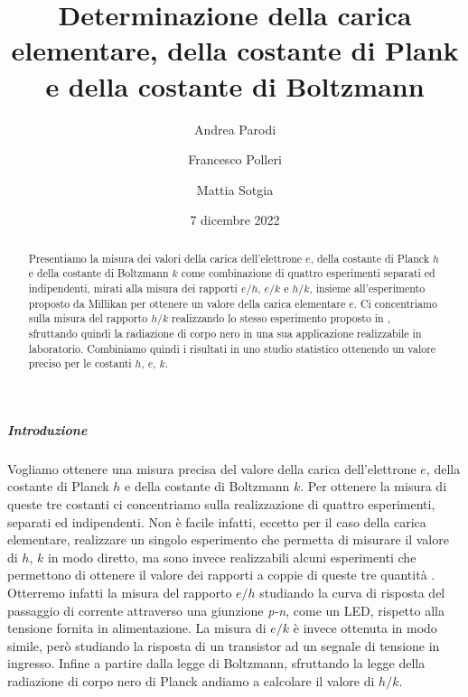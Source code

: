 \documentclass[a4paper, varvw, nofootinbib]{revtex4-2}
\begin{document}
\title{Determinazione della carica elementare, della costante di Plank e della costante di Boltzmann}
\author{Andrea Parodi}
\author{Francesco Polleri}
\author{Mattia Sotgia}
\date{7 dicembre 2022}

\begin{abstract}
Presentiamo la misura dei valori della carica dell'elettrone $e$, della costante di Planck $h$ e della costante di Boltzmann $k$ come combinazione di quattro esperimenti separati ed indipendenti, mirati alla misura dei rapporti $e/h$, $e/k$ \cite{inmanMeasurementIntroductoryPhysics1973} e $h/k$, insieme all'esperimento proposto da Millikan \cite{millikanIsolationIonPrecision1911} per ottenere un valore della carica elementare $e$. Ci concentriamo sulla misura del rapporto $h/k$ realizzando lo stesso esperimento proposto in \cite{crandallMinimalApparatusDetermination1983}, sfruttando quindi la radiazione di corpo nero in una sua applicazione realizzabile in laboratorio. Combiniamo quindi i risultati in uno studio statistico ottenendo un valore preciso per le costanti $h$, $e$, $k$. 
\end{abstract}

\maketitle

\subparagraph*{Introduzione} Vogliamo ottenere una misura precisa del valore della carica dell'elettrone $e$, della costante di Planck $h$ e della costante di Boltzmann $k$. Per ottenere la misura di queste tre costanti ci concentriamo sulla realizzazione di quattro esperimenti, separati ed indipendenti. Non è facile infatti, eccetto per il caso della carica elementare, realizzare un singolo esperimento che permetta di misurare il valore di $h$, $k$ in modo diretto, ma sono invece realizzabili alcuni esperimenti che permettono di ottenere il valore dei rapporti a coppie di queste tre quantità \cite{inmanMeasurementIntroductoryPhysics1973, millikanIsolationIonPrecision1911, crandallMinimalApparatusDetermination1983}. Otterremo infatti la misura del rapporto $e/h$ studiando la curva di risposta del passaggio di corrente attraverso una giunzione \emph{p-n}, come un {LED}, rispetto alla tensione fornita in alimentazione. La misura di $e/k$ è invece ottenuta in modo simile, però studiando la risposta di un transistor ad un segnale di tensione in ingresso. Infine a partire dalla legge di Boltzmann, sfruttando la legge della radiazione di corpo nero di Planck andiamo a calcolare il valore di $h/k$. 
\end{document}
